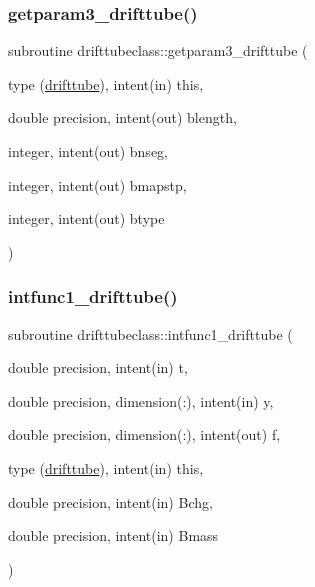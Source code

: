\mbox{\label{namespacedrifttubeclass_a4dc53dfc73175d3eb0d420c6cb9d64f8}} 
\subsubsection{\texorpdfstring{getparam3\_drifttube()}{getparam3\_drifttube()}}
{\footnotesize\ttfamily subroutine drifttubeclass\+::getparam3\+\_\+drifttube (\begin{DoxyParamCaption}\item[{type (\mbox{\hyperlink{namespacedrifttubeclass_structdrifttubeclass_1_1drifttube}{drifttube}}), intent(in)}]{this,  }\item[{double precision, intent(out)}]{blength,  }\item[{integer, intent(out)}]{bnseg,  }\item[{integer, intent(out)}]{bmapstp,  }\item[{integer, intent(out)}]{btype }\end{DoxyParamCaption})}

\mbox{\label{namespacedrifttubeclass_a053027aad7a9b20bafb34d676de9a14a}} 
\subsubsection{\texorpdfstring{intfunc1\_drifttube()}{intfunc1\_drifttube()}}
{\footnotesize\ttfamily subroutine drifttubeclass\+::intfunc1\+\_\+drifttube (\begin{DoxyParamCaption}\item[{double precision, intent(in)}]{t,  }\item[{double precision, dimension(\+:), intent(in)}]{y,  }\item[{double precision, dimension(\+:), intent(out)}]{f,  }\item[{type (\mbox{\hyperlink{namespacedrifttubeclass_structdrifttubeclass_1_1drifttube}{drifttube}}), intent(in)}]{this,  }\item[{double precision, intent(in)}]{Bchg,  }\item[{double precision, intent(in)}]{Bmass }\end{DoxyParamCaption})}

